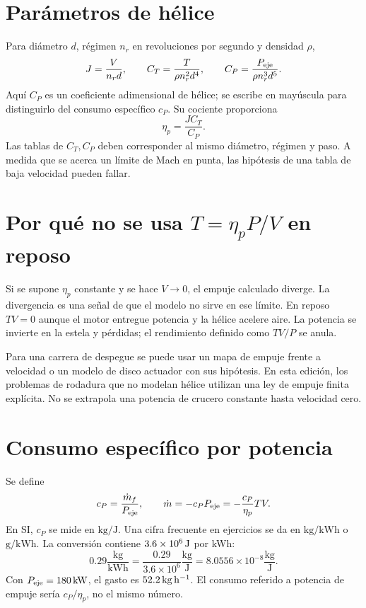 \section{Parámetros de hélice}
Para diámetro $d$, régimen $n_r$ en revoluciones por segundo y densidad $\rho$,
\begin{equation}
J=\frac{V}{n_rd},\qquad C_T=\frac{T}{\rho n_r^2d^4},\qquad
C_P=\frac{P_{\rm eje}}{\rho n_r^3d^5}.
\end{equation}
Aquí $C_P$ es un coeficiente adimensional de hélice; se escribe en mayúscula para distinguirlo del consumo específico $c_P$. Su cociente proporciona
\begin{equation}
\eta_p=\frac{JC_T}{C_P}.
\end{equation}
Las tablas de $C_T,C_P$ deben corresponder al mismo diámetro, régimen y paso. A medida que se acerca un límite de Mach en punta, las hipótesis de una tabla de baja velocidad pueden fallar.

\section{Por qué no se usa $T=\eta_pP/V$ en reposo}
Si se supone $\eta_p$ constante y se hace $V\to0$, el empuje calculado diverge. La divergencia es una señal de que el modelo no sirve en ese límite. En reposo $TV=0$ aunque el motor entregue potencia y la hélice acelere aire. La potencia se invierte en la estela y pérdidas; el rendimiento definido como $TV/P$ se anula.

Para una carrera de despegue se puede usar un mapa de empuje frente a velocidad o un modelo de disco actuador con sus hipótesis. En esta edición, los problemas de rodadura que no modelan hélice utilizan una ley de empuje finita explícita. No se extrapola una potencia de crucero constante hasta velocidad cero.


\section{Consumo específico por potencia}
Se define
\begin{equation}
c_P=\frac{\dot m_f}{P_{\rm eje}},\qquad
\dot m=-c_PP_{\rm eje}=-\frac{c_P}{\eta_p}TV.
\end{equation}
En SI, $c_P$ se mide en $\mathrm{kg/J}$. Una cifra frecuente en ejercicios se da en $\mathrm{kg/kWh}$ o $\mathrm{g/kWh}$. La conversión contiene $3.6\times10^6\,\mathrm{J}$ por kWh:
\begin{equation}
0.29\frac{\mathrm{kg}}{\mathrm{kWh}}
=\frac{0.29}{3.6\times10^6}\frac{\mathrm{kg}}{\mathrm J}
=8.0556\times10^{-8}\frac{\mathrm{kg}}{\mathrm J}.
\end{equation}
Con $P_{\rm eje}=180\,\mathrm{kW}$, el gasto es $52.2\,\mathrm{kg\,h^{-1}}$. El consumo referido a potencia de empuje sería $c_P/\eta_p$, no el mismo número.

